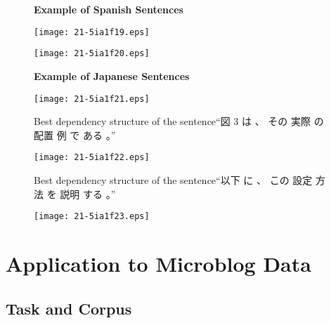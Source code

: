 \documentclass[english]{jnlp_1.4}
\begin{document}
\clearpage
\begin{figure}[p]
\noindent
\large\textbf{Example of Spanish Sentences}
\vspace{1\Cvs}
\begin{center}
\texttt{[image: 21-5ia1f19.eps]}
\end{center}
\label{es0}
\end{figure}
\begin{figure}[p]
\begin{center}
\texttt{[image: 21-5ia1f20.eps]}
\end{center}
\label{es1}
\end{figure}
\begin{figure}[p]
\noindent
\large\textbf{Example of Japanese Sentences}
\vspace{1\Cvs}
\begin{center}
\texttt{[image: 21-5ia1f21.eps]}
\end{center}
\caption{Best dependency structure of the sentence“図 3 は 、 その 実際 の 配置 例 で ある 。”}
\label{ja0}
\end{figure}
\begin{figure}[p]
\begin{center}
\texttt{[image: 21-5ia1f22.eps]}
\end{center}
\caption{Best dependency structure of the sentence“以下 に 、 この 設定 方法 を 説明 する 。”}
\label{ja1}
\end{figure}


\clearpage
\begin{figure}[t]
\begin{center}
\texttt{[image: 21-5ia1f23.eps]}
\end{center}
\label{ja2}
\end{figure}


\section{Application to Microblog Data}
\label{application}

\subsection{Task and Corpus}
\end{document}
